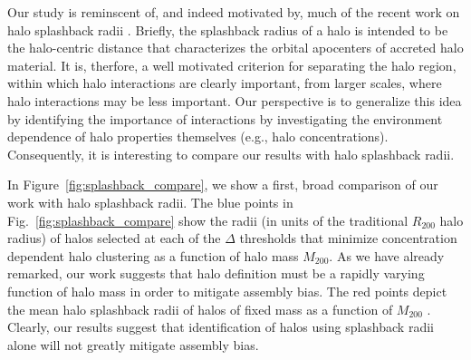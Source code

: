\documentclass[usenatbib,fleqn]{mnras}
\begin{document}
Our study is reminscent of, and indeed motivated by, much of the recent work on halo splashback radii \citep{more_etal15}.  Briefly, the splashback radius of a halo is intended to be the halo-centric distance that characterizes the orbital apocenters of accreted halo material. It is, therfore, a well motivated criterion for separating the halo region, within which halo interactions are clearly important, from larger scales, where halo interactions may be less important. Our perspective is to generalize this idea by identifying the importance of interactions by investigating the environment dependence of halo properties themselves (e.g., halo concentrations). Consequently, it is interesting to compare our results with halo splashback radii. 

In Figure~\ref{fig:splashback_compare}, we show a first, broad comparison of our work with halo splashback radii. The blue points in Fig.~\ref{fig:splashback_compare} show the radii (in units of the traditional $R_{200}$ halo radius) of halos selected at each of the $\Delta$ thresholds that minimize concentration dependent halo clustering as a function of halo mass $M_{200}$. As we have already remarked, our work suggests that halo definition must be a rapidly varying function of halo mass in order to mitigate assembly bias. The red points depict the mean halo splashback radii of halos of fixed mass as a function of $M_{200}$ \citep[from][]{more_etal15}. Clearly, our results suggest that identification of halos using splashback radii alone will not greatly mitigate assembly bias. 
\end{document}
